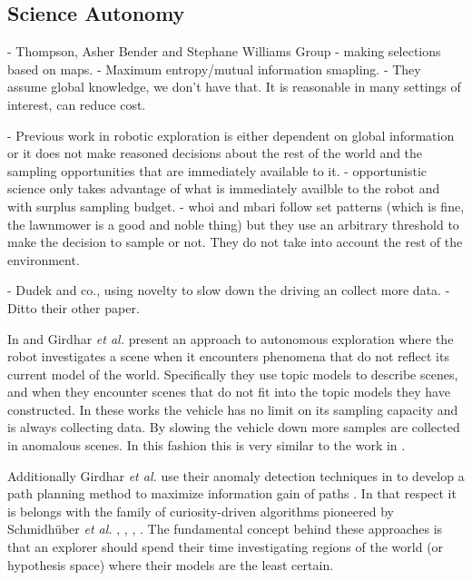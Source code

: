 \subsection{Science Autonomy}

	- Thompson, Asher Bender and Stephane Williams Group
			- making selections based on maps.  
			- Maximum entropy/mutual information smapling.
			- They assume global knowledge, we don't have that.  It is reasonable
			in many settings of interest, can reduce cost.


	- Previous work in robotic exploration is either dependent on global information or it does not make reasoned decisions about the rest of the world and the sampling opportunities that are immediately available to it.
			- opportunistic science only takes advantage of what is immediately availble to the robot and with surplus sampling budget.
			- whoi and mbari follow set patterns (which is fine, the lawnmower is a good and noble thing) but they use an arbitrary threshold to make the decision to sample or not.  They do not take into account the rest of the environment.


	- Dudek and co., using novelty to slow down the driving an collect more data.
		- Ditto their other paper.

In \cite{gridhar2013autonomous} and \cite{girdhar2013Aautonomous} Girdhar
\emph{et al.} present an approach to autonomous exploration where the robot
investigates a scene when it encounters phenomena that do not reflect its
current model of the world.  Specifically they use topic models to describe
scenes, and when they encounter scenes that do not fit into the topic models
they have constructed.  In these works the vehicle has no limit on its sampling
capacity and is always collecting data.  By slowing the vehicle down more
samples are collected in anomalous scenes.  In this fashion this is very
similar to the work in \cite{thompson2013adaptive}.

Additionally Girdhar \emph{et al.} use their anomaly detection techniques in
\cite{girdhar2013autonomous} to develop a path planning method to maximize
information gain of paths \cite{girdhar2014curiosity}.  In that respect it is
belongs with the family of curiosity-driven algorithms pioneered by
Schmidh{\"u}ber \emph{et al.} \cite{schmidhuber1997what},
\cite{schmidhuber2003exploring}, \cite{schmidhuber2009simple},
\cite{sun2011planning}.  The fundamental concept behind these approaches is
that an explorer should spend their time investigating regions of the world (or
hypothesis space) where their models are the least certain.

